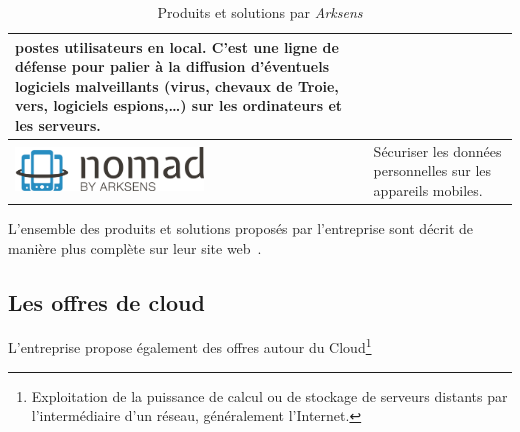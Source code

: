 \documentclass[a4paper,10pt, twoside]{report}
\begin{document}
\begin{spacing}{1.2}
\begin{table}[h!]
\begin{tabular}{m{6cm}m{6cm}}
    postes utilisateurs en local. C'est une ligne de défense pour palier
    à la diffusion d'éventuels logiciels malveillants (virus, chevaux de
    Troie, vers, logiciels espions,\ldots{}) sur les ordinateurs et les
    serveurs.\\
    \hline
    \includegraphics[width=5cm, fbox]{produits/nomad.png} & Sécuriser les
    données personnelles sur les appareils mobiles.\\
    \hline
  \end{tabular}
  \caption{\label{tabProduits} Produits et solutions par \textit{Arksens}}
\end{table}

L'ensemble des produits et solutions proposés par l'entreprise sont décrit
de manière plus complète sur leur site web~\cite{refArksens}.

\subsection{Les offres de cloud}

L'entreprise propose également des offres autour du Cloud\footnote{
Exploitation de la puissance de calcul ou de stockage de serveurs distants
par l'intermédiaire d'un réseau, généralement l'Internet.}


\end{spacing}
\end{document}
